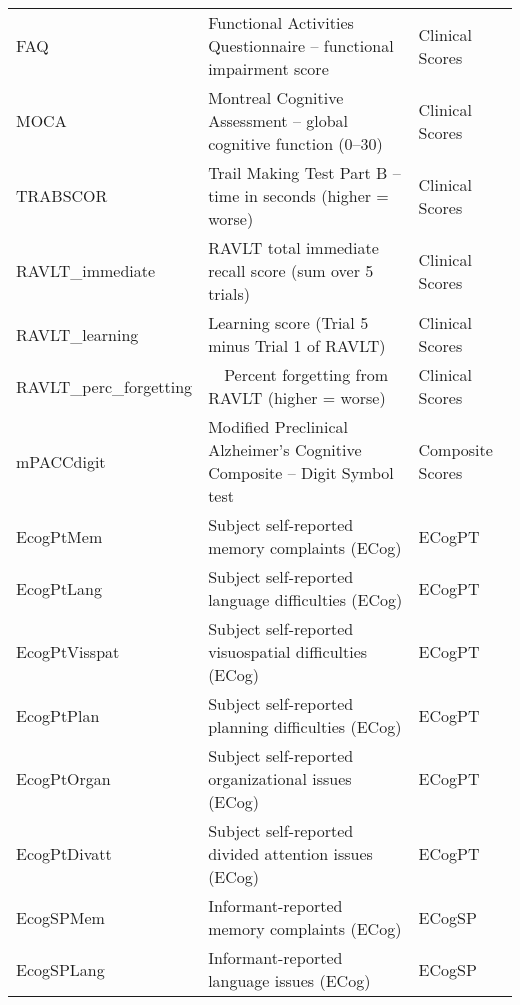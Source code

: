 \begin{table}[H]
\begin{adjustbox}{max width=\textwidth}
\begin{tabularx}{\textwidth}{>{\raggedright\arraybackslash}p{3cm} >{\raggedright\arraybackslash}X >{\raggedright\arraybackslash}p{3cm}}
			FAQ                   & Functional Activities Questionnaire – functional impairment score                  & Clinical Scores       \\
			MOCA                  & Montreal Cognitive Assessment – global cognitive function (0–30)                   & Clinical Scores       \\
			TRABSCOR              & Trail Making Test Part B – time in seconds (higher = worse)                        & Clinical Scores       \\
			RAVLT\_immediate       & RAVLT total immediate recall score (sum over 5 trials)                             & Clinical Scores       \\
			RAVLT\_learning        & Learning score (Trial 5 minus Trial 1 of RAVLT)                                    & Clinical Scores       \\
			RAVLT\_perc\_forgetting & ~~Percent forgetting from RAVLT (higher = worse)                                     & Clinical Scores       \\
			mPACCdigit            & Modified Preclinical Alzheimer’s Cognitive Composite – Digit Symbol test           & Composite Scores      \\
			EcogPtMem             & Subject self-reported memory complaints (ECog)                                     & ECogPT                \\
			EcogPtLang            & Subject self-reported language difficulties (ECog)                                 & ECogPT                \\
			EcogPtVisspat         & Subject self-reported visuospatial difficulties (ECog)                             & ECogPT                \\
			EcogPtPlan            & Subject self-reported planning difficulties (ECog)                                 & ECogPT                \\
			EcogPtOrgan           & Subject self-reported organizational issues (ECog)                                 & ECogPT                \\
			EcogPtDivatt          & Subject self-reported divided attention issues (ECog)                              & ECogPT                \\
			EcogSPMem             & Informant-reported memory complaints (ECog)                                        & ECogSP                \\
			EcogSPLang            & Informant-reported language issues (ECog)                                          & ECogSP                \\

\end{tabularx}
\end{adjustbox}
\end{table}
